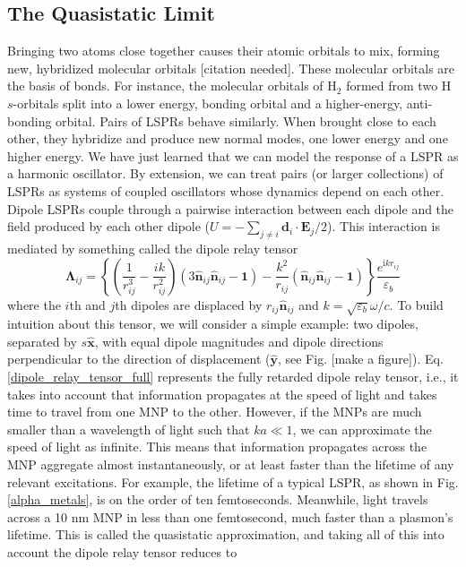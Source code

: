 \documentclass [11pt, proquest] {uwthesis}[2016/11/22]
\begin{document}
\subsection{The Quasistatic Limit}
Bringing two atoms close together causes their atomic orbitals to mix, forming new, hybridized molecular orbitals [citation needed]. These molecular orbitals are the basis of bonds. For instance, the molecular orbitals of $\textrm{H}_2$ formed from two H $s$-orbitals split into a lower energy, bonding orbital and a higher-energy, anti-bonding orbital. Pairs of LSPRs behave similarly. When brought close to each other, they hybridize and produce new normal modes, one lower energy and one higher energy. We have just learned that we can model the response of a LSPR as a harmonic oscillator. By extension, we can treat pairs (or larger collections) of LSPRs as systems of coupled oscillators whose dynamics depend on each other. Dipole LSPRs couple through a pairwise interaction between each dipole and the field produced by each other dipole ($U = -\sum_{j\neq i}\textbf{d}_i\cdot\textbf{E}_j/2$). This interaction is mediated by something called the dipole relay tensor
\begin{equation}
\boldsymbol{\Lambda}_{ij} = \left\{\left(\frac{1}{r_{ij}^3} - \frac{ik}{r_{ij}^2}\right)\left(3\hat{\textbf{n}}_{ij}\hat{\textbf{n}}_{ij} - \textbf{1}\right) - \frac{k^2}{r_{ij}}\left(\hat{\textbf{n}}_{ij}\hat{\textbf{n}}_{ij} - \textbf{1}\right)\right\}\frac{e^{\textrm{i}kr_{ij}}}{\varepsilon_b}
\label{dipole_relay_tensor_full}
\end{equation}
where the $i$th and $j$th dipoles are displaced by $r_{ij}\hat{\textbf{n}}_{ij}$ and $k=\sqrt{\varepsilon_b}\omega/c$. To build intuition about this tensor, we will consider a simple example: two dipoles, separated by $s\hat{\textbf{x}}$, with equal dipole magnitudes and dipole directions perpendicular to the direction of displacement ($\hat{\textbf{y}}$, see Fig. [make a figure]). Eq. \ref{dipole_relay_tensor_full} represents the fully retarded dipole relay tensor, i.e., it takes into account that information propagates at the speed of light and takes time to travel from one MNP to the other. However, if the MNPs are much smaller than a wavelength of light such that $ka \ll 1$, we can approximate the speed of light as infinite. This means that information propagates across the MNP aggregate almost instantaneously, or at least faster than the lifetime of any relevant excitations. For example, the lifetime of a typical LSPR, as shown in Fig. \ref{alpha_metals}, is on the order of ten femtoseconds. Meanwhile, light travels across a 10 nm MNP in less than one femtosecond, much faster than a plasmon's lifetime. This is called the quasistatic approximation, and taking all of this into account the dipole relay tensor reduces to
\end{document}
